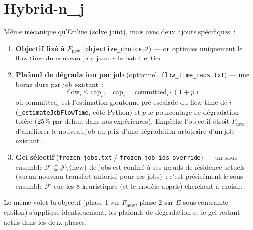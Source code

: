 \documentclass[11pt]{article}
\begin{document}
\section{Hybrid-n\_j}

Même mécanique qu'Online (solve joint), mais avec deux ajouts spécifiques~:

\begin{enumerate}
  \item \textbf{Objectif fixé à $F_{\mathrm{new}}$} (\texttt{objective\_choice=2}) — on optimise
        uniquement le flow time du nouveau job, jamais le batch entier.
  \item \textbf{Plafond de dégradation par job} (optionnel, \texttt{flow\_time\_caps.txt}) — une
        borne dure par job existant~:
        \[
          \mathrm{flow}_i \le \mathrm{cap}_i, \quad \mathrm{cap}_i = \mathrm{committed}_i \cdot (1 + p)
        \]
        où $\mathrm{committed}_i$ est l'estimation gloutonne pré-escalade du flow time de $i$
        (\texttt{\_estimateJobFlowTime}, côté Python) et $p$ le pourcentage de dégradation toléré
        (25\% par défaut dans nos expériences). Empêche l'objectif étroit $F_{\mathrm{new}}$
        d'améliorer le nouveau job au prix d'une dégradation arbitraire d'un job existant.
  \item \textbf{Gel sélectif} (\texttt{frozen\_jobs.txt} / \texttt{frozen\_job\_ids\_override}) —
        un sous-ensemble $\mathcal{F} \subseteq \mathcal{J} \setminus \{\text{new}\}$ de jobs est
        confiné à ses nœuds de résidence actuels (aucun nouveau transfert autorisé pour ces
        jobs)~; c'est précisément le sous-ensemble $\mathcal{F}$ que les 8 heuristiques (et le
        modèle appris) cherchent à choisir.
\end{enumerate}

Le même volet bi-objectif (phase 1 sur $F_{\mathrm{new}}$, phase 2 sur $E$ sous contrainte
epsilon) s'applique identiquement, les plafonds de dégradation et le gel restant actifs dans les
deux phases.
\end{document}
